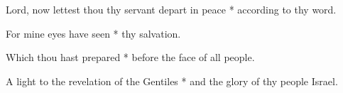 Lord, now lettest thou thy servant depart in peace * according to thy word.

For mine eyes have seen * thy salvation.

Which thou hast prepared * before the face of all people.

A light to the revelation of the Gentiles * and the glory of thy people Israel.
